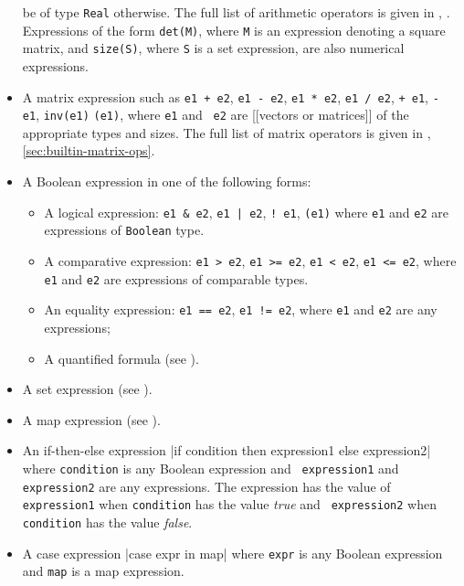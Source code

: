 \documentclass[12pt]{article}
\begin{document}
\begin{itemize}
  be of type {\tt Real} otherwise. The full list of arithmetic
  operators is given in , .
  Expressions of the form {\tt det(M)}, where {\tt M} is an expression
  denoting a square matrix, and {\tt size(S)}, where {\tt S} is a set
  expression, are also numerical expressions.
\item A matrix expression such as \texttt{e1 + e2}, \texttt{e1 - e2},
  \texttt{e1 * e2}, \texttt{e1 / e2},  \texttt{+ e1},
  \texttt{- e1}, {\tt inv(e1)} \texttt{(e1)}, where {\tt e1} and {\tt
    e2} are [[vectors or matrices]] of the appropriate types and
  sizes. The full list of matrix
  operators is given in ,
  \ref{sec:builtin-matrix-ops}.
\item A Boolean expression in one of the following forms:
\begin{itemize}
\item A logical expression: \texttt{e1 \& e2}, \texttt{e1 | e2}, \texttt{! e1}, \texttt{(e1)} where 
\texttt{e1} and \texttt{e2} are expressions of {\tt Boolean} type.
\item A comparative expression: \texttt{e1 > e2}, \texttt{e1 >= e2}, \texttt{e1 < e2}, \texttt{e1 <= e2}, where \texttt{e1} and \texttt{e2} are expressions of comparable types.
\item An equality expression: \texttt{e1 == e2}, \texttt{e1 != e2}, where \texttt{e1} and \texttt{e2} are any expressions;
\item A quantified formula (see ).
\end{itemize}
\item A set expression (see ).
\item A map expression (see ).
\item An if-then-else expression
     \blog|if condition then expression1 else expression2|
     where {\tt condition} is any Boolean expression and {\tt
       expression1} and {\tt expression2} are any expressions.
     The expression has the value of {\tt
       expression1} when {\tt condition} has the value {\it true}
     and {\tt
       expression2} when {\tt condition} has the value {\it false}.
\item A case expression
    \blog|case expr in map|
     where {\tt expr} is any Boolean expression and {\tt map} is a map
     expression.
\end{itemize}
\end{document}
